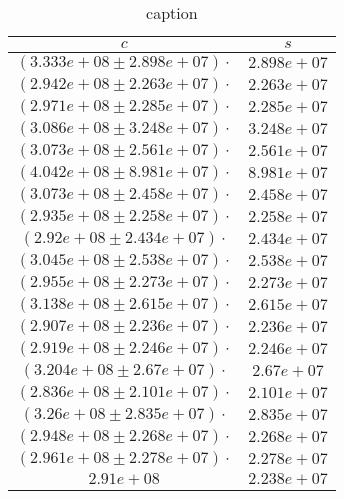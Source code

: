 \begin{table}[H]
    \centering
        \begin{tabular}{|c|c|}
        \hline
        $ c $ & $ s $\\
        \hline
        $ (3.333e+08 \pm 2.898e+07) \cdot $ & $ 2.898e+07 $\\
        \hline
        $ (2.942e+08 \pm 2.263e+07) \cdot $ & $ 2.263e+07 $\\
        \hline
        $ (2.971e+08 \pm 2.285e+07) \cdot $ & $ 2.285e+07 $\\
        \hline
        $ (3.086e+08 \pm 3.248e+07) \cdot $ & $ 3.248e+07 $\\
        \hline
        $ (3.073e+08 \pm 2.561e+07) \cdot $ & $ 2.561e+07 $\\
        \hline
        $ (4.042e+08 \pm 8.981e+07) \cdot $ & $ 8.981e+07 $\\
        \hline
        $ (3.073e+08 \pm 2.458e+07) \cdot $ & $ 2.458e+07 $\\
        \hline
        $ (2.935e+08 \pm 2.258e+07) \cdot $ & $ 2.258e+07 $\\
        \hline
        $ (2.92e+08 \pm 2.434e+07) \cdot $ & $ 2.434e+07 $\\
        \hline
        $ (3.045e+08 \pm 2.538e+07) \cdot $ & $ 2.538e+07 $\\
        \hline
        $ (2.955e+08 \pm 2.273e+07) \cdot $ & $ 2.273e+07 $\\
        \hline
        $ (3.138e+08 \pm 2.615e+07) \cdot $ & $ 2.615e+07 $\\
        \hline
        $ (2.907e+08 \pm 2.236e+07) \cdot $ & $ 2.236e+07 $\\
        \hline
        $ (2.919e+08 \pm 2.246e+07) \cdot $ & $ 2.246e+07 $\\
        \hline
        $ (3.204e+08 \pm 2.67e+07) \cdot $ & $ 2.67e+07 $\\
        \hline
        $ (2.836e+08 \pm 2.101e+07) \cdot $ & $ 2.101e+07 $\\
        \hline
        $ (3.26e+08 \pm 2.835e+07) \cdot $ & $ 2.835e+07 $\\
        \hline
        $ (2.948e+08 \pm 2.268e+07) \cdot $ & $ 2.268e+07 $\\
        \hline
        $ (2.961e+08 \pm 2.278e+07) \cdot $ & $ 2.278e+07 $\\
        \hline
        $ 2.91e+08 $ & $ 2.238e+07 $\\
        \hline
        \end{tabular}
    \caption{caption}
\end{table}

